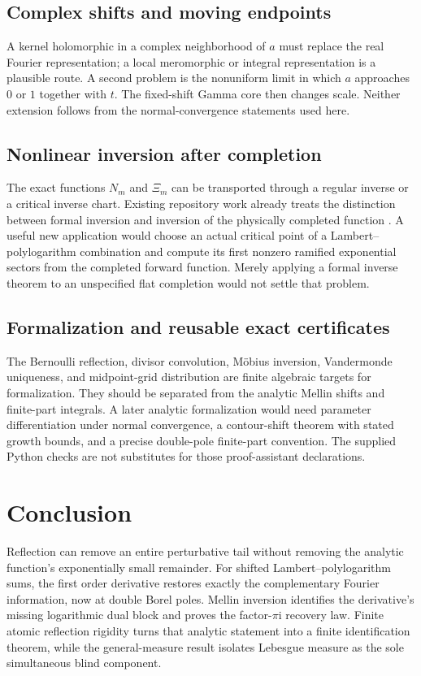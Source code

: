 \documentclass[11pt,a4paper]{article}
\numberwithin{equation}{section}
\theoremstyle{definition}\newtheorem{definition}[theorem]{Definition}
\theoremstyle{remark}\newtheorem{remark}[theorem]{Remark}
\newcommand{\ii}{\mathrm i}\newcommand{\e}{\mathrm e}
\begin{document}
\subsection{Complex shifts and moving endpoints}
A kernel holomorphic in a complex neighborhood of $a$ must replace the
real Fourier representation; a local meromorphic or integral
representation is a plausible route. A second problem is the
nonuniform limit in which $a$ approaches $0$ or $1$ together with $t$.
The fixed-shift Gamma core then changes scale. Neither extension follows
from the normal-convergence statements used here.

\subsection{Nonlinear inversion after completion}
The exact functions $N_m$ and $\Xi_m$ can be transported through a
regular inverse or a critical inverse chart. Existing repository work
already treats the distinction between formal inversion and inversion
of the physically completed function \cite{repoq}. A useful new
application would choose an actual critical point of a Lambert--
polylogarithm combination and compute its first nonzero ramified
exponential sectors from the completed forward function. Merely applying
a formal inverse theorem to an unspecified flat completion would not
settle that problem.

\subsection{Formalization and reusable exact certificates}
The Bernoulli reflection, divisor convolution, M\"obius inversion,
Vandermonde uniqueness, and midpoint-grid distribution are finite
algebraic targets for formalization. They should be separated from the
analytic Mellin shifts and finite-part integrals. A later analytic
formalization would need parameter differentiation under normal
convergence, a contour-shift theorem with stated growth bounds, and a
precise double-pole finite-part convention. The supplied Python checks
are not substitutes for those proof-assistant declarations.

\section*{Conclusion}
Reflection can remove an entire perturbative tail without removing the
analytic function's exponentially small remainder. For shifted
Lambert--polylogarithm sums, the first order derivative restores exactly
the complementary Fourier information, now at double Borel poles.
Mellin inversion identifies the derivative's missing logarithmic dual
block and proves the factor-$\pi\ii$ recovery law. Finite atomic
reflection rigidity turns that analytic statement into a finite
identification theorem, while the general-measure result isolates
Lebesgue measure as the sole simultaneous blind component.
\end{document}
